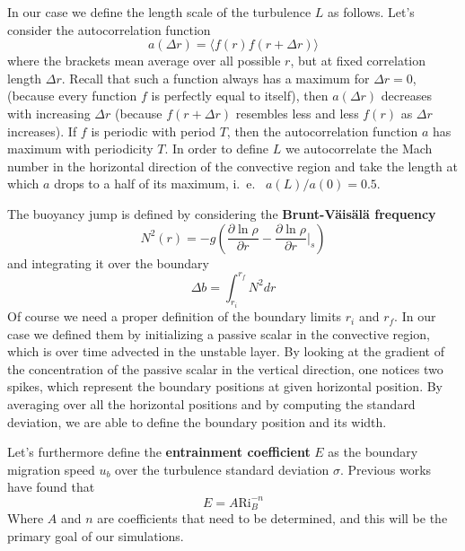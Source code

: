 In our case we define the length scale of the turbulence $L$ as follows. Let's consider the autocorrelation function 
\begin{equation}\label{correlation}
	a(\Delta r)= \langle f(r) f(r + \Delta r) \rangle
\end{equation}
where the brackets mean average over all possible $r$, but at fixed correlation length $\Delta r$. Recall that such a function always has a maximum for $\Delta r=0$, (because every function $f$ is perfectly equal to itself), then $a(\Delta r)$ decreases with increasing $\Delta r$ (because $f(r+\Delta r)$ resembles less and less $f(r)$ as $\Delta r$ increases). If $f$ is periodic with period $T$, then the autocorrelation function $a$ has maximum with periodicity $T$. In order to define $L$ we autocorrelate the Mach number in the horizontal direction of the convective region and take the length at which $a$ drops to a half of its maximum, i.\ e. \ $a(L)/a(0)=0.5$.

The buoyancy jump is defined by considering the \textbf{Brunt-Väisälä frequency} 
\begin{equation}
	N^2(r)=-g \left (  \frac{\partial \ln \rho}{\partial r} -  \frac{\partial \ln \rho}{\partial r} \Big|_{s}  \right )
\end{equation}
and integrating it over the boundary
\begin{equation}\label{eq:buoyancyjump}
	\Delta b = \int_{r_i}^{r_f} N^2 dr
\end{equation}
Of course we need a proper definition of the boundary limits $r_i$ and $r_f$. In our case we defined them by initializing a passive scalar in the convective region, which is over time advected in the unstable layer. By looking at the gradient of the concentration of the passive scalar in the vertical direction, one notices two spikes, which represent the boundary positions at given horizontal position. By averaging over all the horizontal positions and by computing the standard deviation, we are able to define the boundary position and its width.

Let's furthermore define the \textbf{entrainment coefficient} $E$ as the boundary migration speed $u_b$ over the turbulence standard deviation $\sigma$. Previous works have found that
\begin{equation}\label{eq:bulkrichardson}
	E=A \mathrm{Ri}_{B}^{-n}
\end{equation}
Where $A$ and $n$ are coefficients that need to be determined, and this will be the primary goal of our simulations.

